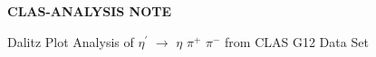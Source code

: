 \begin{center}
{\large\bf  CLAS-ANALYSIS NOTE}
\end{center}
\vspace*{.8cm}
\begin{center}
{ Dalitz Plot Analysis of $\eta^{\prime}$ $\rightarrow$ $\eta$ $\pi^{+}$ $\pi^{-}$ from CLAS G12 Data Set}
\end{center}

\vspace*{.6cm}
\vspace*{.8cm}
\vspace{3cm}
\vspace{.8cm}
\begin{center}\large\bfseries

\end{center}
\vspace*{.5cm}


